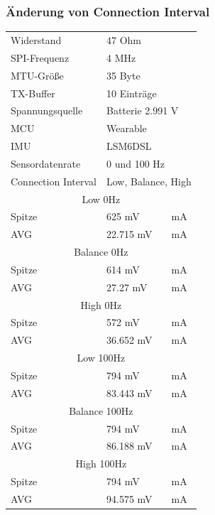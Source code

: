 \subsubsection{Änderung von Connection Interval}
\begin{minipage}{\linewidth}
	\label{tab:aaaaaaaaaaaaaaaa}
	\begin{tabularx}{\linewidth}{|l|l|X|}
		Widerstand & \multicolumn{2}{l|}{47 Ohm}\\
    SPI-Frequenz & \multicolumn{2}{l|}{4 MHz}\\
    MTU-Größe & \multicolumn{2}{l|}{35 Byte}\\
    TX-Buffer & \multicolumn{2}{l|}{10 Einträge}\\
    Spannungsquelle & \multicolumn{2}{l|}{Batterie 2.991 V}\\
    MCU & \multicolumn{2}{l|}{Wearable}\\
    IMU & \multicolumn{2}{l|}{LSM6DSL}\\
    Sensordatenrate & \multicolumn{2}{l|}{0 und 100 Hz}\\
    Connection Interval & \multicolumn{2}{l|}{Low, Balance, High}\\
    \hline
    \multicolumn{3}{|c|}{Low 0Hz}\\
    Spitze & 625 mV & mA\\
    AVG & 22.715 mV & mA\\
    \hline
    \multicolumn{3}{|c|}{Balance 0Hz}\\
    Spitze & 614 mV & mA\\
    AVG & 27.27 mV & mA\\
    \hline
    \multicolumn{3}{|c|}{High 0Hz}\\
    Spitze & 572 mV & mA\\
    AVG & 36.652 mV & mA\\
    \hline
    \multicolumn{3}{|c|}{Low 100Hz}\\
    Spitze & 794 mV & mA\\
    AVG & 83.443 mV & mA\\
    \hline
    \multicolumn{3}{|c|}{Balance 100Hz}\\
    Spitze & 794 mV & mA\\
    AVG & 86.188 mV & mA\\
    \hline
    \multicolumn{3}{|c|}{High 100Hz}\\
    Spitze & 794 mV & mA\\
    AVG & 94.575 mV & mA\\
  \end{tabularx}
\end{minipage}\\\\

